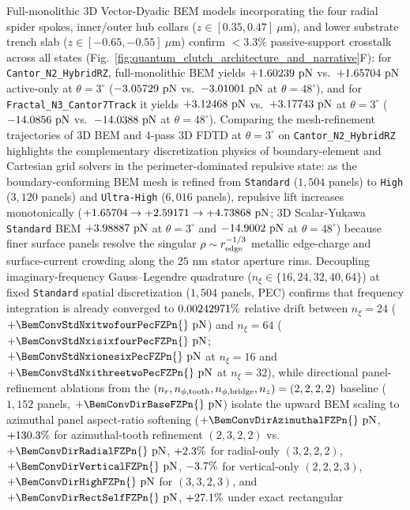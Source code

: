 \documentclass[11pt,letterpaper]{article}
\begin{document}
Full-monolithic 3D Vector-Dyadic BEM models incorporating the four radial spider spokes, inner/outer hub collars ($z \in [0.35, 0.47]\ \mu\text{m}$), and lower substrate trench slab ($z \in [-0.65, -0.55]\ \mu\text{m}$) confirm $<3.3\%$ passive-support crosstalk across all states (Fig.~\ref{fig:quantum_clutch_architecture_and_narrative}F): for \texttt{Cantor\_N2\_HybridRZ}, full-monolithic BEM yields $+1.60239{}\text{ pN}$ vs.\ $+1.65704{}\text{ pN}$ active-only at $\theta=3^\circ$ ($-3.05729{}\text{ pN}$ vs.\ $-3.01001{}\text{ pN}$ at $\theta=48^\circ$), and for \texttt{Fractal\_N3\_Cantor7Track} it yields $+3.12468{}\text{ pN}$ vs.\ $+3.17743{}\text{ pN}$ at $\theta=3^\circ$ ($-14.0856{}\text{ pN}$ vs.\ $-14.0388{}\text{ pN}$ at $\theta=48^\circ$). Comparing the mesh-refinement trajectories of 3D BEM and 4-pass 3D FDTD at $\theta=3^\circ$ on \texttt{Cantor\_N2\_HybridRZ} highlights the complementary discretization physics of boundary-element and Cartesian grid solvers in the perimeter-dominated repulsive state: as the boundary-conforming BEM mesh is refined from \texttt{Standard} ($1{,}504$ panels) to \texttt{High} ($3{,}120$ panels) and \texttt{Ultra-High} ($6{,}016$ panels), repulsive lift increases monotonically ($+1.65704{} \to +2.59171{} \to +4.73868{}\text{ pN}$; 3D Scalar-Yukawa \texttt{Standard} BEM $+3.98887{}\text{ pN}$ at $\theta=3^\circ$ and $-14.9002{}\text{ pN}$ at $\theta=48^\circ$) because finer surface panels resolve the singular $\rho \sim r_{\rm edge}^{-1/3}$ metallic edge-charge and surface-current crowding along the $25\text{ nm}$ stator aperture rims. Decoupling imaginary-frequency Gauss--Legendre quadrature ($n_\xi \in \{16, 24, 32, 40, 64\}$) at fixed \texttt{Standard} spatial discretization ($1{,}504$ panels, PEC) confirms that frequency integration is already converged to $0.00242971{}\%$ relative drift between $n_\xi = 24$ ($+\BemConvStdNxitwofourPecFZPn{}\text{ pN}$) and $n_\xi = 64$ ($+\BemConvStdNxisixfourPecFZPn{}\text{ pN}$; $+\BemConvStdNxionesixPecFZPn{}\text{ pN}$ at $n_\xi = 16$ and $+\BemConvStdNxithreetwoPecFZPn{}\text{ pN}$ at $n_\xi = 32$), while directional panel-refinement ablations from the $(n_r, n_{\phi,\rm tooth}, n_{\phi,\rm bridge}, n_z) = (2,2,2,2)$ baseline ($1{,}152$ panels, $+\BemConvDirBaseFZPn{}\text{ pN}$) isolate the upward BEM scaling to azimuthal panel aspect-ratio softening ($+\BemConvDirAzimuthalFZPn{}\text{ pN}$, $+130.3{}\%$ for azimuthal-tooth refinement $(2,3,2,2)$ vs.\ $+\BemConvDirRadialFZPn{}\text{ pN}$, $+2.3{}\%$ for radial-only $(3,2,2,2)$, $+\BemConvDirVerticalFZPn{}\text{ pN}$, $-3.7{}\%$ for vertical-only $(2,2,2,3)$, $+\BemConvDirHighFZPn{}\text{ pN}$ for $(3,3,2,3)$, and $+\BemConvDirRectSelfFZPn{}\text{ pN}$, $+27.1{}\%$ under exact rectangular 
\end{document}
